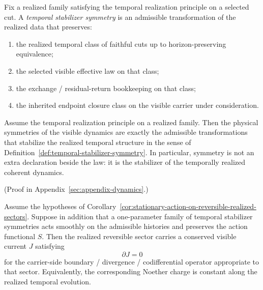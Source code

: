 \begin{definition}
\label{def:temporal-stabilizer-symmetry}
Fix a realized family satisfying the temporal realization principle on a
selected cut. A \emph{temporal stabilizer symmetry} is an admissible
transformation of the realized data that preserves:
\begin{enumerate}[label=(\roman*), leftmargin=2em, itemsep=0.2em]
\item the realized temporal class of faithful cuts up to horizon-preserving
      equivalence;
\item the selected visible effective law on that class;
\item the exchange / residual-return bookkeeping on that class;
\item the inherited endpoint closure class on the visible carrier under
      consideration.
\end{enumerate}
\end{definition}

\begin{theorem}
\label{thm:physical-symmetries-are-temporal-stabilizers}
Assume the temporal realization principle on a realized family. Then the
physical symmetries of the visible dynamics are exactly the admissible
transformations that stabilize the realized temporal structure in the sense of
Definition~\ref{def:temporal-stabilizer-symmetry}. In particular, symmetry is
not an extra declaration beside the law: it is the stabilizer of the
temporally realized coherent dynamics.
\end{theorem}

(Proof in Appendix~\ref{sec:appendix-dynamics}.)

\begin{theorem}
\label{thm:noether-bridge-on-temporally-realized-reversible-sectors}
Assume the hypotheses of
Corollary~\ref{cor:stationary-action-on-reversible-realized-sectors}. Suppose
in addition that a one-parameter family of temporal stabilizer symmetries acts
smoothly on the admissible histories and preserves the action functional
\(S\). Then the realized reversible sector carries a conserved visible current
\(J\) satisfying
\[
\partial J = 0
\]
for the carrier-side boundary / divergence / codifferential operator
appropriate to that sector. Equivalently, the corresponding Noether charge is
constant along the realized temporal evolution.
\end{theorem}

